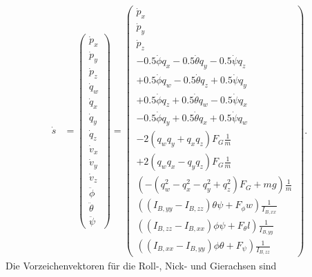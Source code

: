 \begin{align}\label{zustandsvektor:zustandsvektor}
	\dot{s} &= 
	\begin{pmatrix}
		\dot{p}_x\\
		\dot{p}_y\\
		\dot{p}_z\\
		\dot{q}_w\\
		\dot{q}_x\\
		\dot{q}_y\\
		\dot{q}_z\\
		\dot{v}_x\\
		\dot{v}_y\\
		\dot{v}_z\\
		\ddot{\phi}\\
		\ddot{\theta}\\
		\ddot{\psi}
	\end{pmatrix} = 
	\begin{pmatrix}
		\dot{p}_x\\
		\dot{p}_y\\
		\dot{p}_z\\
		-0.5\dot{\phi} q_x - 0.5\dot{\theta} q_y - 0.5\dot{\psi} q_z\\
		+0.5\dot{\phi} q_w - 0.5\dot{\theta} q_z + 0.5\dot{\psi} q_y\\
		+0.5\dot{\phi} q_z + 0.5\dot{\theta} q_w - 0.5\dot{\psi} q_x\\
		-0.5\dot{\phi} q_y + 0.5\dot{\theta} q_x + 0.5\dot{\psi} q_w\\
		-2(q_wq_y + q_xq_z) F_G \frac{1}{m}\\
		+2(q_wq_x - q_yq_z) F_G \frac{1}{m}\\
		(-(q_w^2-q_x^2-q_y^2+q_z^2) F_G + mg) \frac{1}{m}\\
		((I_{B,yy} - I_{B,zz}) \theta \psi + F_{\phi} w) \frac{1}{I_{B,xx}}\\
		((I_{B,zz} - I_{B,xx}) \phi \psi + F_{\theta} l) \frac{1}{I_{B,yy}}\\
		((I_{B,xx} - I_{B,yy}) \phi \theta + F_{\psi})\frac{1}{I_{B,zz}}
	\end{pmatrix}.
\end{align}
Die Vorzeichenvektoren für die Roll-, Nick- und Gierachsen sind
